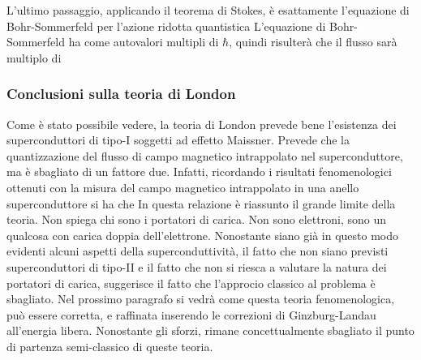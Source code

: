 L'ultimo passaggio, applicando il teorema di Stokes, \`e esattamente l'equazione di Bohr-Sommerfeld per l'azione ridotta quantistica
L'equazione di Bohr-Sommerfeld ha come autovalori multipli di $\hbar$, quindi risulter\`a che il flusso sar\`a multiplo di
\subsubsection{Conclusioni sulla teoria di London}
Come \`e stato possibile vedere, la teoria di London prevede bene l'esistenza dei superconduttori di tipo-I soggetti ad effetto Maissner. Prevede che la quantizzazione del flusso di campo magnetico intrappolato nel superconduttore, ma \`e sbagliato di un fattore due. Infatti, ricordando i risultati fenomenologici ottenuti con la misura del campo magnetico intrappolato in una anello superconduttore si ha che 
In questa relazione \`e riassunto il grande limite della teoria. Non spiega chi sono i portatori di carica. Non sono elettroni, sono un qualcosa con carica doppia dell'elettrone. Nonostante siano gi\`a in questo modo evidenti alcuni aspetti della superconduttivit\`a, il fatto che non siano previsti superconduttori di tipo-II e il fatto che non si riesca a valutare la natura dei portatori di carica, suggerisce il fatto che l'approcio classico al problema \`e sbagliato. Nel prossimo paragrafo si vedr\`a come questa teoria fenomenologica, pu\`o essere corretta, e raffinata inserendo le correzioni di Ginzburg-Landau all'energia libera. Nonostante gli sforzi, rimane concettualmente sbagliato il punto di partenza semi-classico di queste teoria.


















